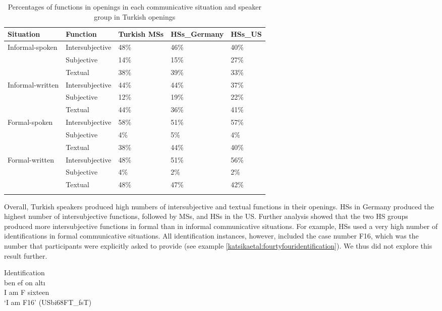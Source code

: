 \documentclass[output=paper,colorlinks,citecolor=brown]{langscibook}
\begin{document}
\begin{table}
\caption{Percentages of functions in openings in each communicative situation and speaker group in Turkish openings}
\label{tab:katsikaetal:Turkishfunctiosopen}
 \begin{tabularx}{\textwidth}{llYYY}
   \lsptoprule
    Situation & Function & Turkish MSs & HSs\_Germany & HSs\_US\\
    
 \midrule
  Informal-spoken & Intersubjective & 48\% & 46\% & 40\%\\
                  & Subjective & 14\% & 15\% & 27\%\\
                  & Textual & 38\% & 39\% & 33\% \\
  Informal-written & Intersubjective & 44\% & 44\% & 37\%\\
                  & Subjective & 12\% & 19\% & 22\%\\
                  & Textual & 44\% & 36\% & 41\%\\
  Formal-spoken   & Intersubjective & 58\% & 51\% & 57\%\\
                  & Subjective & 4\% & 5\% & 4\%\\
                  & Textual & 38\% & 44\% & 40\%\\
  Formal-written  & Intersubjective & 48\% & 51\% & 56\%\\
                  & Subjective & 4\% & 2\% & 2\%\\
                  & Textual & 48\% & 47\% & 42\%\\
  \lspbottomrule
  \end{tabularx}
  \end{table}

Overall, Turkish speakers produced high numbers of intersubjective and textual functions in their openings. HSs in Germany produced the highest number of intersubjective functions, followed by MSs, and HSs in the US. Further analysis showed that the two HS groups produced more intersubjective functions in formal than in informal communicative situations. For example, HSs used a very high number of identifications in formal communicative situations. All identification instances, however, included the case number F16, which was the number that participants were explicitly asked to provide (see example \ref{katsikaetal:fourtyfouridentification}). We thus did not explore this result further. 

\ea Identification\\ \label{katsikaetal:fourtyfouridentification}
\gll ben ef on altı\\
     I am F sixteen\\
\glt ‘I am F16’ (USbi68FT\_fsT)
\z
\end{document}
